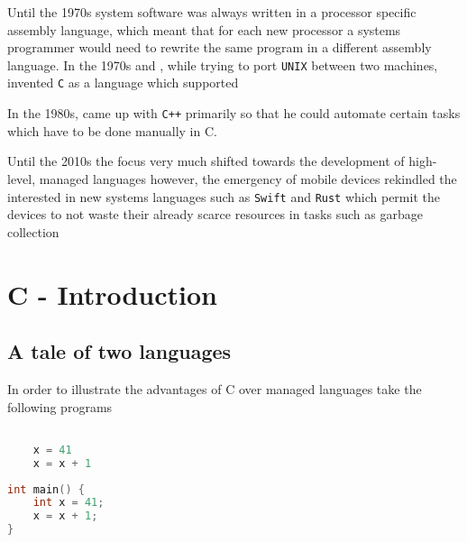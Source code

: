 \par{Until the 1970s system software was always written in a processor specific assembly
language, which meant that for each new processor a systems programmer would need to rewrite the
same program in a different assembly language. In the 1970s  and  , while trying to port \texttt{UNIX} between two machines, invented \texttt{C} as a
 language which supported }

\par{In the 1980s,  came up with \texttt{C++} primarily so that he could
automate certain tasks which have to be done manually in C.}

\par{Until the 2010s the focus very much shifted towards the development of high-level, managed
languages however, the emergency of mobile devices rekindled the interested in new systems languages such as \texttt{Swift} and \texttt{Rust} which permit the devices to not waste their already scarce resources in tasks such as garbage collection}

\section{C - Introduction}

\subsection{A tale of two languages}

\par{In order to illustrate the advantages of C over managed languages take the following programs}

\noindent\begin{minipage}[t]{.45\textwidth}
	\begin{lstlisting}[language=python,]

	x = 41
	x = x + 1
	\end{lstlisting}
	\end{minipage}
\noindent\begin{minipage}[t]{.45\textwidth}
	\begin{lstlisting}[language=C,]
int main() {
	int x = 41;
	x = x + 1;
}
	\end{lstlisting}
\end{minipage}



